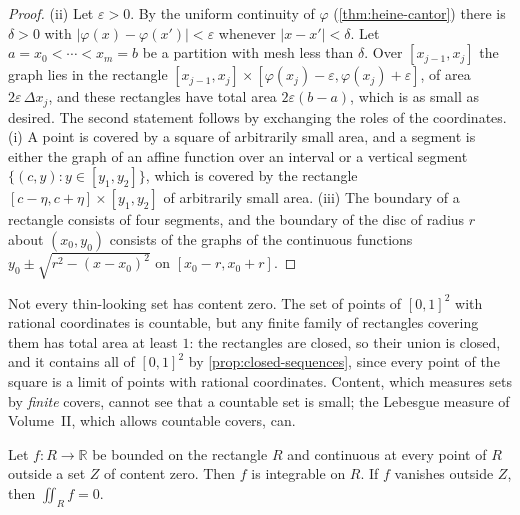 \begin{proof}
(ii) Let $\varepsilon>0$. By the uniform continuity of $\varphi$ (\cref{thm:heine-cantor}) there is $\delta>0$ with $|\varphi(x)-\varphi(x')|<\varepsilon$ whenever $|x-x'|<\delta$. Let $a=x_0<\cdots<x_m=b$ be a partition with mesh less than $\delta$. Over $[x_{j-1},x_j]$ the graph lies in the rectangle $[x_{j-1},x_j]\times[\varphi(x_j)-\varepsilon,\varphi(x_j)+\varepsilon]$, of area $2\varepsilon\,\Delta x_j$, and these rectangles have total area $2\varepsilon(b-a)$, which is as small as desired. The second statement follows by exchanging the roles of the coordinates. (i) A point is covered by a square of arbitrarily small area, and a segment is either the graph of an affine function over an interval or a vertical segment $\{(c,y): y\in[y_1,y_2]\}$, which is covered by the rectangle $[c-\eta,c+\eta]\times[y_1,y_2]$ of arbitrarily small area. (iii) The boundary of a rectangle consists of four segments, and the boundary of the disc of radius $r$ about $(x_0,y_0)$ consists of the graphs of the continuous functions $y_0\pm\sqrt{r^2-(x-x_0)^2}$ on $[x_0-r,x_0+r]$.
\end{proof}

Not every thin-looking set has content zero. The set of points of $[0,1]^2$ with rational coordinates is countable, but any finite family of rectangles covering them has total area at least $1$: the rectangles are closed, so their union is closed, and it contains all of $[0,1]^2$ by \cref{prop:closed-sequences}, since every point of the square is a limit of points with rational coordinates. Content, which measures sets by \emph{finite} covers, cannot see that a countable set is small; the Lebesgue measure of Volume~II, which allows countable covers, can.

\begin{theorem}
\label{thm:integrable-content-zero}
Let $f\colon R\to\mathbb R$ be bounded on the rectangle $R$ and continuous at every point of $R$ outside a set $Z$ of content zero. Then $f$ is integrable on $R$. If $f$ vanishes outside $Z$, then $\iint_Rf=0$.
\end{theorem}


